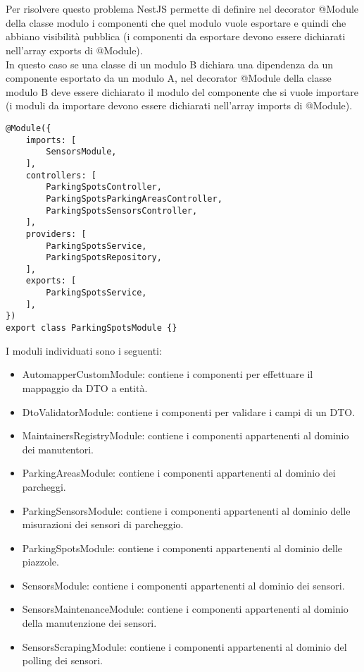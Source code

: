 \\\\
Per risolvere questo problema NestJS permette di definire nel decorator @Module della classe modulo i componenti che
quel modulo vuole esportare e quindi che abbiano visibilità pubblica (i componenti da esportare devono essere dichiarati 
nell'array exports di @Module). 
\\
In questo caso se una classe di un modulo B dichiara una 
dipendenza da un componente esportato da un modulo A, nel decorator @Module della classe modulo B deve essere dichiarato il
modulo del componente che si vuole importare (i moduli da importare devono essere dichiarati nell'array imports di @Module).
\\
\begin{lstlisting}
@Module({
    imports: [ 
        SensorsModule,
    ],
    controllers: [
        ParkingSpotsController, 
        ParkingSpotsParkingAreasController,
        ParkingSpotsSensorsController,
    ],
    providers: [
        ParkingSpotsService,
        ParkingSpotsRepository,
    ],
    exports: [
        ParkingSpotsService,
    ],
})
export class ParkingSpotsModule {}
\end{lstlisting}
\leavevmode\newline
I moduli individuati sono i seguenti:
\begin{itemize}
    \item AutomapperCustomModule: contiene i componenti per effettuare il mappaggio da DTO a entità.
    \item DtoValidatorModule: contiene i componenti per validare i campi di un DTO.
    \item MaintainersRegistryModule: contiene i componenti appartenenti al dominio dei manutentori.
    \item ParkingAreasModule: contiene i componenti appartenenti al dominio dei parcheggi.
    \item ParkingSensorsModule: contiene i componenti appartenenti al dominio delle misurazioni dei sensori di parcheggio.
    \item ParkingSpotsModule: contiene i componenti appartenenti al dominio delle piazzole.
    \item SensorsModule: contiene i componenti appartenenti al dominio dei sensori.
    \item SensorsMaintenanceModule: contiene i componenti appartenenti al dominio della manutenzione dei sensori.
    \item SensorsScrapingModule: contiene i componenti appartenenti al dominio del polling dei sensori.
\end{itemize}